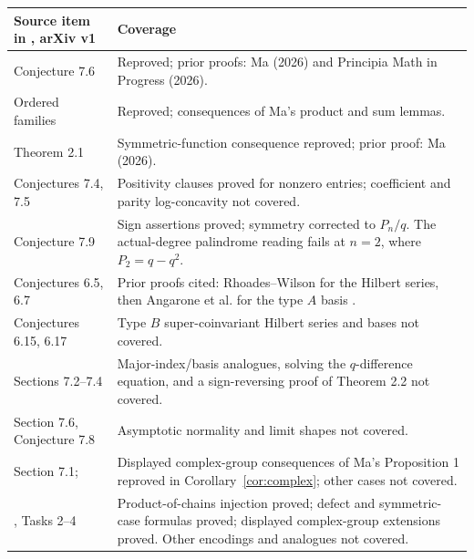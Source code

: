 \documentclass[11pt]{article}
\begin{document}
\begin{center}\small
\begin{tabularx}{\textwidth}{@{}lX@{}}
\toprule
Source item in \cite{SS}, arXiv v1 & Coverage \\
\midrule
Conjecture 7.6 & Reproved; prior proofs: Ma (2026) and Principia Math in Progress (2026). \\
Ordered families & Reproved; consequences of Ma's product and sum lemmas. \\
Theorem 2.1 & Symmetric-function consequence reproved; prior proof: Ma (2026). \\
Conjectures 7.4, 7.5 & Positivity clauses proved for nonzero entries; coefficient and parity log-concavity not covered. \\
Conjecture 7.9 & Sign assertions proved; symmetry corrected to $P_n/q$. The actual-degree palindrome reading fails at $n=2$, where $P_2=q-q^2$. \\
Conjectures 6.5, 6.7 & Prior proofs cited: Rhoades--Wilson for the Hilbert series, then Angarone et al. for the type $A$ basis \cite{RW,ACKMR}. \\
Conjectures 6.15, 6.17 & Type $B$ super-coinvariant Hilbert series and bases not covered. \\
Sections 7.2--7.4 & Major-index/basis analogues, solving the $q$-difference equation, and a sign-reversing proof of Theorem 2.2 not covered. \\
Section 7.6, Conjecture 7.8 & Asymptotic normality and limit shapes not covered. \\
Section 7.1; \cite{Complex} & Displayed complex-group consequences of Ma's Proposition 1 reproved in Corollary~\ref{cor:complex}; other cases not covered. \\
\cite{PM}, Tasks 2--4 & Product-of-chains injection proved; defect and symmetric-case formulas proved; displayed complex-group extensions proved. Other encodings and analogues not covered. \\
\bottomrule
\end{tabularx}
\end{center}
\end{document}
